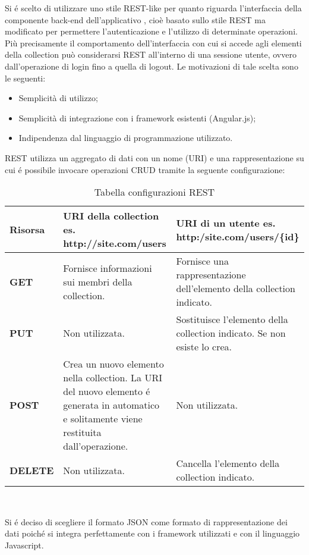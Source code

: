 Si é scelto di utilizzare uno stile REST-like per quanto riguarda l'interfaccia della componente back-end dell'applicativo \PROGETTO, cioè basato sullo stile REST ma modificato per permettere l'autenticazione e l'utilizzo di determinate operazioni. Più precisamente il comportamento dell'interfaccia con cui si accede agli elementi della collection può considerarsi REST all'interno di una sessione utente, ovvero dall'operazione di login fino a quella di logout. Le motivazioni di tale scelta sono le seguenti:
\begin{itemize}
	\item Semplicità di utilizzo;
	\item Semplicità di integrazione con i framework esistenti (Angular.js);
	\item Indipendenza dal linguaggio di programmazione utilizzato.
\end{itemize}
REST utilizza un aggregato di dati con un nome (URI) e una rappresentazione su cui é possibile invocare operazioni CRUD tramite la seguente configurazione:

\begin{table}[h]
	\begin{tabular}{|p{}|p{}|p{}|}
		\toprule
		
		\textbf{Risorsa} & \textbf{URI della collection} \smallbreak
		es. http://site.com/users  & \textbf{URI di un utente} \smallbreak
		  es. http:/site.com/users/\{id\} \\
			
			\midrule
			\textbf{GET} & Fornisce informazioni sui membri della collection. & Fornisce una rappresentazione dell'elemento della collection indicato. \\ \midrule
			\textbf{PUT} & Non utilizzata. & Sostituisce l'elemento della collection indicato. Se non esiste lo crea. \\  \midrule
			\textbf{POST} & Crea un nuovo elemento nella collection. La URI del nuovo elemento é generata in automatico e solitamente viene restituita dall'operazione. & Non utilizzata. \\ \midrule
		\textbf{DELETE} & Non utilizzata. & Cancella l'elemento della collection indicato.  \\ \midrule
		
		
	\end{tabular}\\
	\caption{Tabella configurazioni REST}
	
\end{table}

Si é deciso di scegliere il formato JSON come formato di rappresentazione dei dati poiché si integra perfettamente con i framework utilizzati e con il linguaggio Javascript.